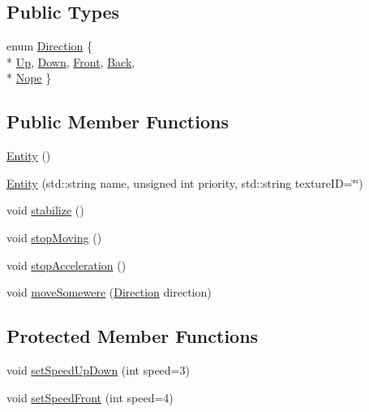 \subsection*{Public Types}
\begin{DoxyCompactItemize}
\item 
enum \hyperlink{class_entity_ac6ff3a9435d7dacb378891eadd127034}{Direction} \{ \\*
\hyperlink{class_entity_ac6ff3a9435d7dacb378891eadd127034a4803b5fc09325c357306efca6aec7d51}{Up}, 
\hyperlink{class_entity_ac6ff3a9435d7dacb378891eadd127034aca17a432012ff0ad12d64fb7002a8dfb}{Down}, 
\hyperlink{class_entity_ac6ff3a9435d7dacb378891eadd127034acdaf97e899d1e2f8c6e954407b9e9639}{Front}, 
\hyperlink{class_entity_ac6ff3a9435d7dacb378891eadd127034a8c4d4b4ceef8bff2884d0bf450a0bff6}{Back}, 
\\*
\hyperlink{class_entity_ac6ff3a9435d7dacb378891eadd127034a869b7581994c699f0dab2b617d30a12d}{Nope}
 \}
\end{DoxyCompactItemize}
\subsection*{Public Member Functions}
\begin{DoxyCompactItemize}
\item 
\hyperlink{class_entity_a980f368aa07ce358583982821533a54a}{Entity} ()
\item 
\hyperlink{class_entity_af0d855b4b36ea55fa5e374e3381c13cc}{Entity} (std\-::string name, unsigned int priority, std\-::string texture\-I\-D=\char`\"{}\char`\"{})
\item 
void \hyperlink{class_entity_a2e553246efacb426f0806faf59b017e7}{stabilize} ()
\item 
void \hyperlink{class_entity_a7c921a26a91394a2cb6aca2aae78bbbe}{stop\-Moving} ()
\item 
void \hyperlink{class_entity_a4b8c151c2e5f7337b4cf74df6ccc62f5}{stop\-Acceleration} ()
\item 
void \hyperlink{class_entity_a0f563cb7a800d95e7b8f2c030f9435f4}{move\-Somewere} (\hyperlink{class_entity_ac6ff3a9435d7dacb378891eadd127034}{Direction} direction)
\end{DoxyCompactItemize}
\subsection*{Protected Member Functions}
\begin{DoxyCompactItemize}
\item 
void \hyperlink{class_entity_aba5b0aae47c86e29e813d91e9bcab02b}{set\-Speed\-Up\-Down} (int speed=3)
\item 
void \hyperlink{class_entity_a5f6cf81a507a7b4a4068528b3c9faf24}{set\-Speed\-Front} (int speed=4)
\end{DoxyCompactItemize}
